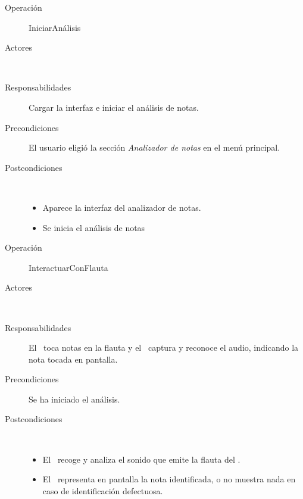 \begin{description}
\item[Operación] IniciarAnálisis
\item[Actores] \jugador\, \sistema\
\item[Responsabilidades] Cargar la interfaz e iniciar el análisis de notas.
\item[Precondiciones] El usuario eligió la sección \textit{Analizador de notas}
  en el menú principal.
\item[Postcondiciones] $\quad$
  \begin{itemize}
  \item Aparece la interfaz del analizador de notas.
  \item Se inicia el análisis de notas
  \end{itemize}
\end{description}

\begin{description}
\item[Operación] InteractuarConFlauta
\item[Actores] \jugador\, \sistema\
\item[Responsabilidades] El \jugador\ toca notas en la flauta y el \sistema\
  captura y reconoce el audio, indicando la nota tocada en pantalla.

\item[Precondiciones] Se ha iniciado el análisis.

\item[Postcondiciones] $\quad$
  \begin{itemize}
  \item El \sistema\ recoge y analiza el sonido que emite la flauta del \jugador.
  \item El \sistema\ representa en pantalla la nota identificada, o no muestra
    nada en caso de identificación defectuosa.
  \end{itemize}
\end{description}

  
